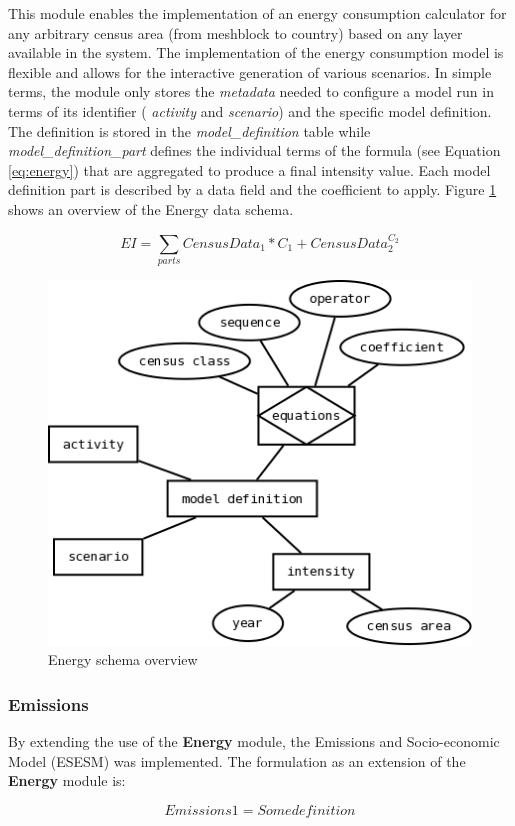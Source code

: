 This module enables the implementation of an energy consumption calculator for any arbitrary census area (from meshblock to country) based on any layer available in the system. The implementation of the energy consumption model is flexible and allows for the interactive generation of various scenarios. 
In simple terms, the module only stores the \textit{metadata} needed to configure a model run in terms of its identifier ( \textit{activity} and \textit{scenario}) and the specific model definition. The definition is stored in the \textit{model\_definition} table while \textit{model\_definition\_part} defines the individual terms of the formula (see Equation \ref{eq:energy}) that are aggregated to produce a final intensity
value. Each model definition part is described by a data field and the coefficient to apply. Figure \ref{fig:energy_diag} shows an overview of the Energy data schema.

\begin{equation}
\label{eq:energy}
EI=\sum_{parts}{CensusData_1*C_1+CensusData_2^{C_2}}
\end{equation}


\begin{figure}
	\caption{Energy schema overview}
	\label{fig:energy_diag}
	\includegraphics[width = 12cm]{energy.png}
\end{figure}

\subsubsection*{Emissions}
By extending the use of the \textbf{Energy} module, the Emissions and Socio-economic Model (ESESM) was implemented. The formulation as an extension of the \textbf{Energy} module is:

\begin{equation}
\label{eq:ESESM}
Emissions1 = Some definition
\end{equation}
